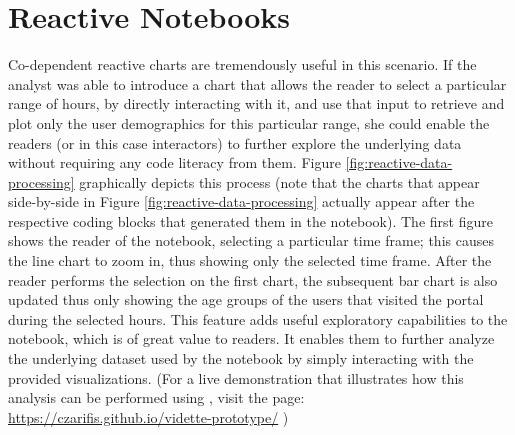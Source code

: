 \section{Reactive Notebooks} 

 Co-dependent reactive charts are tremendously useful in this scenario. If the analyst was able to introduce a chart that allows the reader to select a particular range of hours, by directly interacting with it, and use that input to retrieve and plot only the user demographics for this particular range, she could enable the readers (or in this case interactors) to further explore the underlying data without requiring any code literacy from them. Figure \ref{fig:reactive-data-processing} graphically depicts this process (note that the charts that appear side-by-side in Figure \ref{fig:reactive-data-processing} actually appear after the respective coding blocks that generated them in the notebook). The first figure shows the reader of the notebook, selecting a particular time frame; this causes the line chart to zoom in, thus showing only the selected time frame. After the reader performs the selection on the first chart, the subsequent bar chart is also updated thus only showing the age groups of the users that visited the portal during the selected hours. This feature adds useful exploratory capabilities to the notebook, which is of great value to readers. It enables them to further analyze the underlying dataset used by the notebook by simply interacting with the provided visualizations. (For a live demonstration that illustrates how this analysis can be performed using \projname, visit the page: \url{https://czarifis.github.io/vidette-prototype/} )


